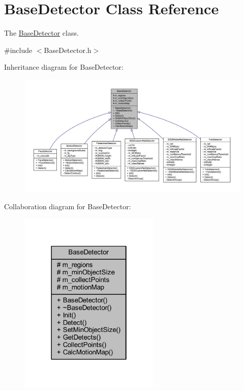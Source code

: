 \hypertarget{class_base_detector}{}\section{Base\+Detector Class Reference}
\label{class_base_detector}


The \mbox{\hyperlink{class_base_detector}{Base\+Detector}} class.  




{\ttfamily \#include $<$Base\+Detector.\+h$>$}



Inheritance diagram for Base\+Detector\+:\nopagebreak
\begin{figure}[H]
\begin{center}
\leavevmode
\includegraphics[width=350pt]{class_base_detector__inherit__graph}
\end{center}
\end{figure}


Collaboration diagram for Base\+Detector\+:\nopagebreak
\begin{figure}[H]
\begin{center}
\leavevmode
\includegraphics[width=190pt]{class_base_detector__coll__graph}
\end{center}
\end{figure}

